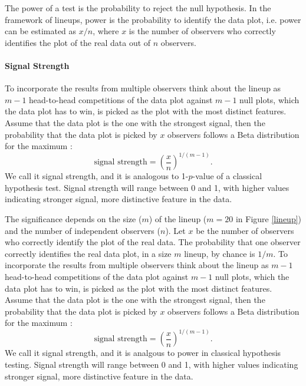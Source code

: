 The power of a test is the probability to reject the null hypothesis. In the framework of lineups, power is the probability to identify the data plot, i.e. power can be estimated as $x/n$, where $x$ is the number of observers who correctly identifies the plot of the real data out of $n$ observers.


\paragraph{Signal Strength}
To incorporate the results from multiple
observers think about the lineup as $m-1$ head-to-head competitions of
the data plot against $m-1$ null plots, which the data plot has to
win, is picked as the plot with the most distinct features. Assume
that the data plot is the one with the strongest signal, then the
probability that the data plot is picked by $x$ observers follows a
Beta distribution for the maximum \citet{****}:
\[
\text{signal strength} =  \left( \frac{x}{n}\right)^{1/(m-1)}.
\]
We call it signal strength, and it is analogous to 1-$p$-value of a classical hypothesis test. Signal strength will range between 0 and 1, with higher values indicating stronger signal, more distinctive feature in the data.




The significance depends on the size ($m$) of
the lineup ($m=20$ in Figure \ref{lineup}) and the number of
independent observers ($n$). Let $x$ be the number of observers who
correctly identify the plot of the real data. The probability that one
observer correctly identifies the real data plot, in a size $m$
lineup, by chance is $1/m$. To incorporate the results from multiple
observers think about the lineup as $m-1$ head-to-head competitions of
the data plot against $m-1$ null plots, which the data plot has to
win, is picked as the plot with the most distinct features. Assume
that the data plot is the one with the strongest signal, then the
probability that the data plot is picked by $x$ observers follows a
Beta distribution for the maximum \citet{****}:
\[
\text{signal strength} =  \left( \frac{x}{n}\right)^{1/(m-1)}.
\]
We call it signal strength, and it is analgous to power in classical hypothesis testing. Signal strength will range between 0 and 1, with higher values indicating stronger signal, more distinctive feature in the data.


